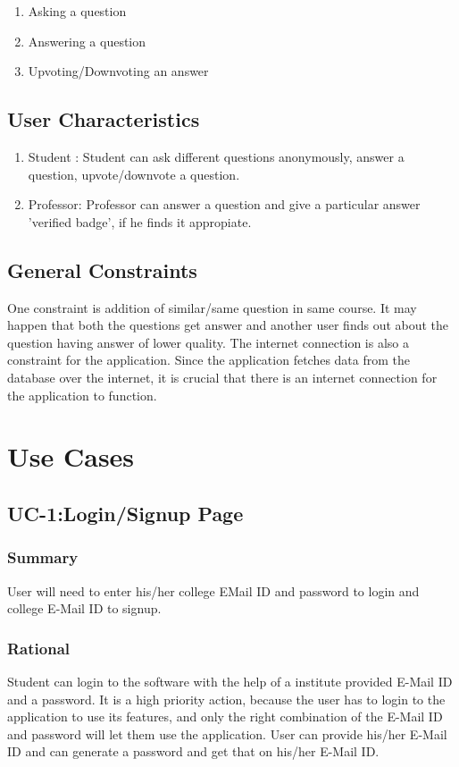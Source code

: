 \documentclass[12pt]{article}
\begin{document}
\begin{enumerate}
\item Asking a question
\item Answering a question
\item Upvoting/Downvoting an answer
\end{enumerate} 

\subsection{User Characteristics}
\begin{enumerate}
\item Student : Student can ask different questions anonymously, answer a question, upvote/downvote a question.
\item Professor: Professor can answer a question and  give a particular answer 'verified badge', if he finds it appropiate.
\end{enumerate} 

\subsection{General Constraints}
One constraint is addition of similar/same question in same course. It may happen that both the questions get answer and another user finds out about the question having answer of lower quality. The internet connection is also a constraint for the application. Since the application fetches data from the database over the internet, it is crucial that there is an internet connection for the application to function. 

\section{Use Cases}

\subsection{UC-1:Login/Signup Page}
\subsubsection{Summary}
User will need to enter his/her college EMail ID and password to login and college E-Mail ID to signup.
\subsubsection{Rational}
Student can login to the software with the help of a institute provided E-Mail ID and a password. It is a high priority action, because the user has to login to the application to use its features, and only the right combination
of the E-Mail ID and password will let them use the application. User can provide his/her E-Mail ID and can generate a password and get that on his/her E-Mail ID.
\end{document}
